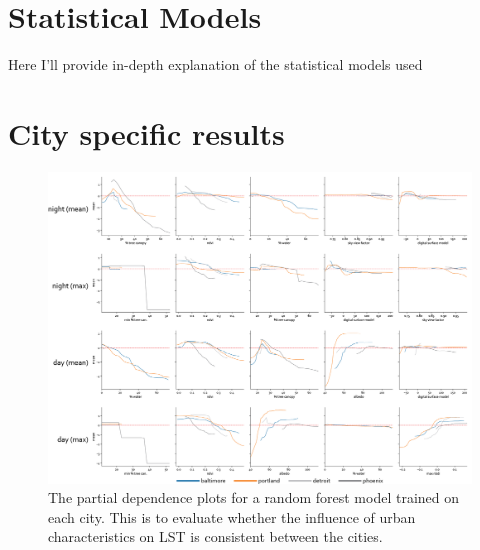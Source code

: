 \documentclass[final,3p,times,twocolumn,sort&compress]{elsarticle}
\begin{document}
\newpage
\section{Statistical Models}

\lbrack Here I'll provide in-depth explanation of the statistical models used \rbrack


\newpage
\section{City specific results}
\label{ss:city}
\begin{figure}[h]
    \centering
    \includegraphics[width=\linewidth]{fig/report/pdp_cities_500.png}
    \caption[City specific partial dependence plots]{
    The partial dependence plots for a random forest model trained on each city.
    This is to evaluate whether the influence of urban characteristics on LST is consistent between the cities.
    }
    \label{fig:cities_500}
\end{figure}
\end{document}
